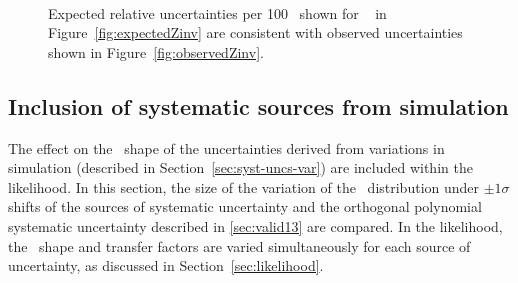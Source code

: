 \begin{figure}[h!]
  \centering
  ~~
  \\
  \caption{\label{fig:expectedObservedZinv}Expected relative uncertainties per 100 \GeV~shown for \zInv~ in Figure~\ref{fig:expectedZinv} are consistent
  with observed uncertainties shown in Figure~\ref{fig:observedZinv}.}
\end{figure}



\newpage
\subsection{Inclusion of systematic sources from simulation}
\label{sec:mcSystStudiesShape}

The effect on the \mht~shape of the uncertainties derived from variations in simulation 
(described in Section~\ref{sec:syst-uncs-var}) are included within the likelihood.
In this section, the size of the variation of the \mht~distribution under $\pm1\sigma$ shifts of the
sources of systematic uncertainty and the orthogonal polynomial systematic uncertainty
described in \ref{sec:valid13} are compared. In the likelihood, the \mht~shape and transfer factors
are varied simultaneously for each source of uncertainty, as discussed in Section~\ref{sec:likelihood}.

